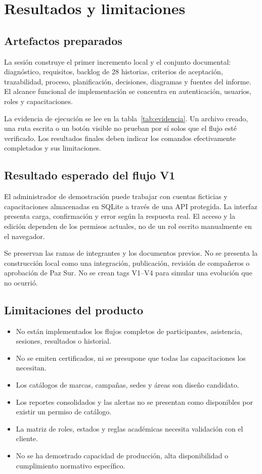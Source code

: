 \chapter{Resultados y limitaciones}
\section{Artefactos preparados}
La sesión construye el primer incremento local y el conjunto documental: diagnóstico, requisitos, backlog de 28 historias, criterios de aceptación, trazabilidad, proceso, planificación, decisiones, diagramas y fuentes del informe. El alcance funcional de implementación se concentra en autenticación, usuarios, roles y capacitaciones.

La evidencia de ejecución se lee en la tabla~\ref{tab:evidencia}. Un archivo creado, una ruta escrita o un botón visible no prueban por sí solos que el flujo esté verificado. Los resultados finales deben indicar los comandos efectivamente completados y sus limitaciones.

\section{Resultado esperado del flujo V1}
El administrador de demostración puede trabajar con cuentas ficticias y capacitaciones almacenadas en SQLite a través de una API protegida. La interfaz presenta carga, confirmación y error según la respuesta real. El acceso y la edición dependen de los permisos actuales, no de un rol escrito manualmente en el navegador.

Se preservan las ramas de integrantes y los documentos previos. No se presenta la construcción local como una integración, publicación, revisión de compañeros o aprobación de Paz Sur. No se crean tags V1--V4 para simular una evolución que no ocurrió.

\section{Limitaciones del producto}
\begin{itemize}
  \item No están implementados los flujos completos de participantes, asistencia, sesiones, resultados o historial.
  \item No se emiten certificados, ni se presupone que todas las capacitaciones los necesitan.
  \item Los catálogos de marcas, campañas, sedes y áreas son diseño candidato.
  \item Los reportes consolidados y las alertas no se presentan como disponibles por existir un permiso de catálogo.
  \item La matriz de roles, estados y reglas académicas necesita validación con el cliente.
  \item No se ha demostrado capacidad de producción, alta disponibilidad o cumplimiento normativo específico.
\end{itemize}

